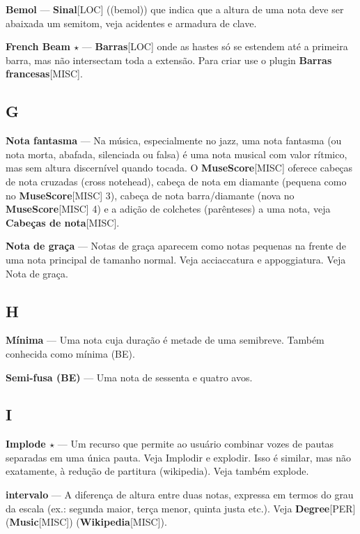 \documentclass[a4paper,12pt]{article}
\begin{document}
\textbf{Bemol} --- \textbf{Sinal}\textsc{[LOC]} ((bemol)) que indica que a altura de uma nota deve ser abaixada um semitom, veja acidentes e armadura de clave.

\textbf{French Beam $\star$} --- \textbf{Barras}\textsc{[LOC]} onde as hastes só se estendem até a primeira barra, mas não intersectam toda a extensão. Para criar use o plugin \textbf{Barras francesas}\textsc{[MISC]}.

\subsection*{G}
\textbf{Nota fantasma} --- Na música, especialmente no jazz, uma nota fantasma (ou nota morta, abafada, silenciada ou falsa) é uma nota musical com valor rítmico, mas sem altura discernível quando tocada. O \textbf{MuseScore}\textsc{[MISC]} oferece cabeças de nota cruzadas (cross notehead), cabeça de nota em diamante (pequena como no \textbf{MuseScore}\textsc{[MISC]} 3), cabeça de nota barra/diamante (nova no \textbf{MuseScore}\textsc{[MISC]} 4) e a adição de colchetes (parênteses) a uma nota, veja \textbf{Cabeças de nota}\textsc{[MISC]}.

\textbf{Nota de graça} --- Notas de graça aparecem como notas pequenas na frente de uma nota principal de tamanho normal. Veja acciaccatura e appoggiatura. Veja Nota de graça.

\subsection*{H}
\textbf{Mínima} --- Uma nota cuja duração é metade de uma semibreve. Também conhecida como mínima (BE).

\textbf{Semi-fusa (BE)} --- Uma nota de sessenta e quatro avos.

\subsection*{I}
\textbf{Implode $\star$} --- Um recurso que permite ao usuário combinar vozes de pautas separadas em uma única pauta. Veja Implodir e explodir. Isso é similar, mas não exatamente, à redução de partitura (wikipedia). Veja também explode.

\textbf{intervalo} --- A diferença de altura entre duas notas, expressa em termos do grau da escala (ex.: segunda maior, terça menor, quinta justa etc.). Veja \textbf{Degree}\textsc{[PER]} (\textbf{Music}\textsc{[MISC]}) (\textbf{Wikipedia}\textsc{[MISC]}).
\end{document}

